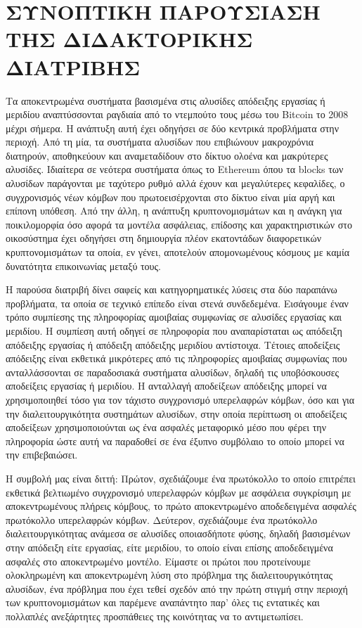 \ifuniversity
\chapter*{ΣΥΝΟΠΤΙΚΗ ΠΑΡΟΥΣΙΑΣΗ ΤΗΣ ΔΙΔΑΚΤΟΡΙΚΗΣ ΔΙΑΤΡΙΒΗΣ}
\thispagestyle{empty}

Τα αποκεντρωμένα συστήματα βασισμένα στις αλυσίδες απόδειξης εργασίας ή μεριδίου
αναπτύσσονται ραγδιαία από το ντεμπούτο τους μέσω του Bitcoin το 2008 μέχρι σήμερα.
Η ανάπτυξη αυτή έχει οδηγήσει σε δύο κεντρικά προβλήματα στην περιοχή. Από τη μία,
τα συστήματα αλυσίδων που επιβιώνουν μακροχρόνια διατηρούν, αποθηκεύουν και αναμεταδίδουν
στο δίκτυο ολοένα και μακρύτερες αλυσίδες. Ιδιαίτερα σε νεότερα συστήματα όπως το Ethereum
όπου τα blocks των αλυσίδων παράγονται με ταχύτερο ρυθμό αλλά έχουν και μεγαλύτερες κεφαλίδες,
ο συγχρονισμός νέων κόμβων που πρωτοεισέρχονται στο δίκτυο είναι μία αργή και επίπονη υπόθεση.
Από την άλλη, η ανάπτυξη κρυπτονομισμάτων και η ανάγκη για ποικιλομορφία όσο αφορά τα
μοντέλα ασφάλειας, επίδοσης και χαρακτηριστικών στο οικοσύστημα έχει οδηγήσει στη δημιουργία
πλέον εκατοντάδων διαφορετικών κρυπτονομισμάτων τα οποία, εν γένει, αποτελούν απομονωμένους
κόσμους με καμία δυνατότητα επικοινωνίας μεταξύ τους.

Η παρούσα διατριβή δίνει σαφείς και κατηγορηματικές λύσεις στα δύο
παραπάνω προβλήματα, τα οποία σε τεχνικό επίπεδο είναι στενά συνδεδεμένα. Εισάγουμε έναν
τρόπο συμπίεσης της πληροφορίας αμοιβαίας συμφωνίας σε αλυσίδες εργασίας
και μεριδίου. Η συμπίεση αυτή οδηγεί σε πληροφορία που αναπαρίσταται ως
απόδειξη απόδειξης εργασίας ή απόδειξη απόδειξης μεριδίου αντίστοιχα. Τέτοιες αποδείξεις απόδειξης
είναι εκθετικά μικρότερες από τις πληροφορίες αμοιβαίας συμφωνίας που ανταλλάσσονται σε
παραδοσιακά συστήματα αλυσίδων, δηλαδή τις υποβόσκουσες αποδείξεις εργασίας ή μεριδίου.
Η ανταλλαγή αποδείξεων απόδειξης μπορεί να χρησιμοποιηθεί τόσο για τον τάχιστο
συγχρονισμό υπερελαφρών κόμβων, όσο και για την διαλειτουργικότητα συστημάτων αλυσίδων, στην
οποία περίπτωση οι αποδείξεις αποδείξεων χρησιμοποιούνται ως ένα ασφαλές μεταφορικό μέσο
που φέρει την πληροφορία ώστε αυτή να παραδοθεί σε ένα έξυπνο συμβόλαιο το οποίο μπορεί να
την επιβεβαιώσει.

Η συμβολή μας είναι διττή: Πρώτον, σχεδιάζουμε ένα πρωτόκολλο το οποίο επιτρέπει
εκθετικά βελτιωμένο συγχρονισμό υπερελαφρών κόμβων με ασφάλεια συγκρίσιμη με αποκεντρωμένους
πλήρεις κόμβους, το πρώτο αποκεντρωμένο αποδεδειγμένα ασφαλές πρωτόκολλο υπερελαφρών κόμβων.
Δεύτερον, σχεδιάζουμε ένα πρωτόκολλο διαλειτουργικότητας ανάμεσα σε αλυσίδες οποιασδήποτε φύσης,
δηλαδή βασισμένων στην απόδειξη είτε εργασίας, είτε μεριδίου, το οποίο είναι επίσης
αποδεδειγμένα ασφαλές στο αποκεντρωμένο μοντέλο. Είμαστε οι πρώτοι που προτείνουμε ολοκληρωμένη
και αποκεντρωμένη λύση στο πρόβλημα της διαλειτουργικότητας αλυσίδων, ένα πρόβλημα που έχει
τεθεί σχεδόν από την πρώτη στιγμή στην περιοχή των κρυπτονομισμάτων και παρέμενε αναπάντητο
παρ' όλες τις εντατικές και πολλαπλές ανεξάρτητες προσπάθειες της κοινότητας να το αντιμετωπίσει.

